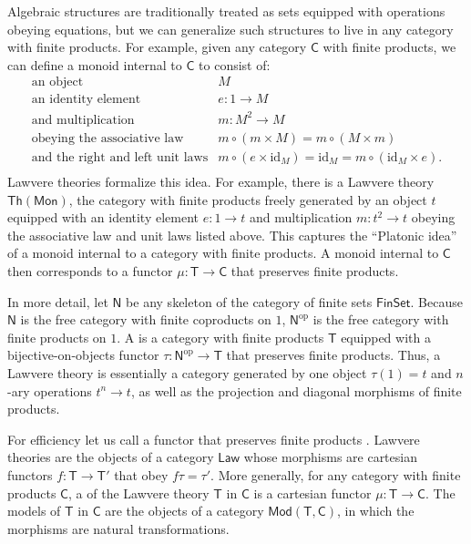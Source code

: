 \documentclass{amsart}
\newcommand{\define}[1]{{\bf \boldmath{#1}}}
\theoremstyle{definition}
\newcommand{\Th}{\mathsf{Th}}
\newcommand{\Law}{\mathsf{Law}}
\newcommand{\Mon}{\mathsf{Mon}}
\newcommand{\Mod}{\mathsf{Mod}}
\newcommand{\FinSet}{\mathsf{FinSet}}
\newcommand{\NN}{\mathsf{N}}
\newcommand{\C}{\mathsf{C}}
\newcommand{\T}{\mathsf{T}}
\newcommand{\op}{\mathrm{op}}
\newcommand{\maps}{\colon}
\newcommand{\id}{\mathrm{id}}
\begin{document}
Algebraic structures are traditionally treated as sets equipped with operations obeying equations, but we can generalize such structures to live in any category with finite products.  For example,
given any category $\C$ with finite products, we can define a monoid internal to $\C$ to consist of:
\[\begin{array}{rl}
\text{an object} & M\\
\text{an identity element} & e\maps 1 \to M\\
\text{and multiplication} & m\maps M^2 \to M\\
\text{obeying the associative law} & m \circ (m \times M) = m \circ (M \times m)\\
\text{and the right and left unit laws} & m \circ (e  \times \id_M) = \id_M = m \circ (\id_M \times e).\\
\end{array}\]
Lawvere theories formalize this idea.  For example, there is a Lawvere theory $\Th(\Mon)$, the category with finite products freely generated by an object $t$ equipped with an identity element $e \maps 1 \to t$ and multiplication $m \maps t^2 \to t$ obeying the associative law and unit laws listed above.    This captures the ``Platonic idea'' of a monoid internal to a category with finite products.  A monoid internal to $\C$ then corresponds to a functor $\mu \maps \T \to \C$ that preserves finite products.  

In more detail, let $\NN$ be any skeleton of the category of finite sets $\FinSet$.  Because $\NN$ is the free category with finite coproducts on $1$, $\NN^\op$ is the free category with finite products on $1$.   A \define{Lawvere theory} is a category with finite products $\T$ equipped with a bijective-on-objects functor $\tau \maps \NN^\op \to \T$ that preserves finite products.   Thus, a Lawvere theory is essentially a category generated by one object $\tau(1) = t$ and $n$-ary operations $t^n \to t$, as well as the projection and diagonal morphisms of finite products.

For efficiency let us call a functor that preserves finite products \define{cartesian}.   Lawvere theories are the objects of a category $\Law$ whose morphisms are cartesian functors $f \maps \T\to \T'$ that obey $f\tau = \tau'$.   More generally, for any category with finite products $\C$, a \define{model} of the Lawvere theory $\T$ in $\C$ is a cartesian functor $\mu \maps \T \to \C$.  The models of $\T$ in $\C$ are the objects of a category $\Mod(\T,\C)$, in which the morphisms are natural transformations.  
\end{document}
